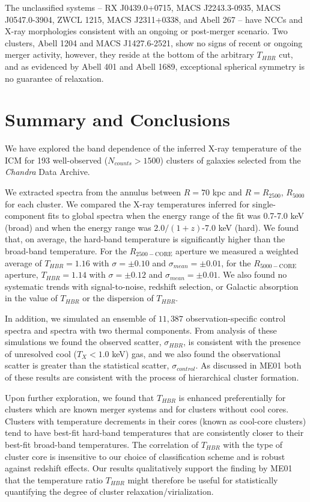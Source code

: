 \documentclass{emulateapj}
\begin{document}
The unclassified systems -- RX J0439.0+0715, MACS J2243.3-0935, MACS
J0547.0-3904, ZWCL 1215, MACS J2311+0338, and Abell 267 -- have NCCs and
X-ray morphologies consistent with an ongoing or post-merger
scenario. Two clusters, Abell 1204 and MACS J1427.6-2521, show no
signs of recent or ongoing merger activity, however, they reside at
the bottom of the arbitrary $T_{HBR}$ cut, and as evidenced by Abell 401 and
Abell 1689, exceptional spherical symmetry is no guarantee of
relaxation.

\section{Summary and Conclusions}\label{sec:summary}

We have explored the band dependence of the inferred X-ray temperature
of the ICM for 193 well-observed ($N_{counts} > 1500$) clusters of
galaxies selected from the {\it Chandra} Data Archive.

We extracted spectra from the annulus between $R=70$ kpc and
$R=R_{2500}$, $R_{5000}$ for each cluster. We compared the X-ray
temperatures inferred for single-component fits to global spectra
when the energy range of the fit was 0.7-7.0 keV (broad) and when the
energy range was $2.0/(1+z)$-7.0 keV (hard). We found that, on
average, the hard-band temperature is significantly higher than
the broad-band temperature. For the $R_{2500-\mathrm{CORE}}$ aperture we measured a
weighted average of $T_{HBR} = 1.16$ with $\sigma = \pm 0.10$ and
$\sigma_{mean} = \pm 0.01$, for the $R_{5000-\mathrm{CORE}}$ aperture,
$T_{HBR} = 1.14$ with $\sigma = \pm 0.12$ and $\sigma_{mean} = \pm
0.01$. We also found no systematic trends with signal-to-noise,
redshift selection, or Galactic absorption in the value of $T_{HBR}$
or the dispersion of $T_{HBR}$.

In addition, we simulated an ensemble of $11,387$ observation-specific
control spectra and spectra with two thermal components. From analysis
of these simulations we found the observed scatter, $\sigma_{HBR}$, is
consistent with the presence of unresolved cool ($T_X < 1.0$ keV) gas,
and we also found the observational scatter is greater than the
statistical scatter, $\sigma_{control}$. As discussed in ME01 both of
these results are consistent with the process of hierarchical cluster
formation.

Upon further exploration, we found that $T_{HBR}$ is enhanced
preferentially for clusters which are known merger systems and for
clusters without cool cores. Clusters with temperature decrements in
their cores (known as cool-core clusters) tend to have best-fit
hard-band temperatures that are consistently closer to their
best-fit broad-band temperatures. The correlation of $T_{HBR}$ with
the type of cluster core is insensitive to our choice of
classification scheme and is robust against redshift effects. Our
results qualitatively support the finding by ME01 that the temperature
ratio $T_{HBR}$ might therefore be useful for statistically
quantifying the degree of cluster relaxation/virialization.
\end{document}
